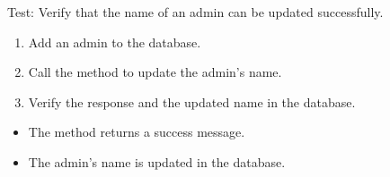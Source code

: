 \documentclass[letterpaper,10pt,english]{sphinxmanual}
\begin{document}
\begin{fulllineitems}
\label{\detokenize{test:test.test_admin.test_update_admin_name_success}}
\pysigstartsignatures
\pysiglinewithargsret
{}
{}
{}
\pysigstopsignatures
\sphinxAtStartPar
Test: Verify that the name of an admin can be updated successfully.
\begin{description}
\begin{enumerate}
%
\item {} 
\sphinxAtStartPar
Add an admin to the database.

\item {} 
\sphinxAtStartPar
Call the  method to update the admin’s name.

\item {} 
\sphinxAtStartPar
Verify the response and the updated name in the database.

\end{enumerate}

\begin{itemize}
\item {} 
\sphinxAtStartPar
The method returns a success message.

\item {} 
\sphinxAtStartPar
The admin’s name is updated in the database.

\end{itemize}

\end{description}

\end{fulllineitems}

\end{document}
